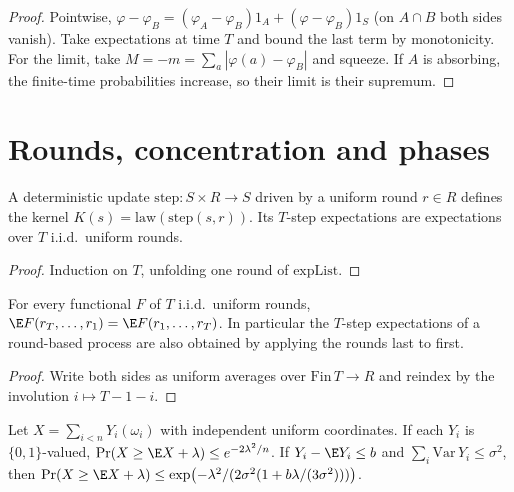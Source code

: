 \begin{proof}\leanok
Pointwise, $\varphi-\varphi_B=(\varphi_A-\varphi_B)1_A+(\varphi-\varphi_B)1_S$ (on
$A\cap B$ both sides vanish). Take expectations at time $T$ and bound the last term by
monotonicity. For the limit, take $M=-m=\sum_a|\varphi(a)-\varphi_B|$ and squeeze. If $A$
is absorbing, the finite-time probabilities increase, so their limit is their supremum.
\end{proof}

\section{Rounds, concentration and phases}
\begin{definition}\label{def:ofstep}
\leanok{}
A deterministic update $\mathrm{step}\colon S\times R\to S$ driven by a uniform
round $r\in R$ defines the kernel $K(s)=\mathrm{law}(\mathrm{step}(s,r))$. Its
$T$-step expectations are expectations over $T$ i.i.d.\ uniform rounds.
\end{definition}
\begin{proof}\leanok
Induction on $T$, unfolding one round of $\mathrm{expList}$.
\end{proof}
\begin{theorem}\label{thm:reverse}
\leanok{}
For every functional $F$ of $T$ i.i.d.\ uniform rounds,
$\E F(r_T,\dots,r_1)=\E F(r_1,\dots,r_T)$. In particular the $T$-step expectations of a
round-based process are also obtained by applying the rounds last to first.
\end{theorem}
\begin{proof}\leanok
Write both sides as uniform averages over $\mathrm{Fin}\,T\to R$ and reindex by the
involution $i\mapsto T-1-i$.
\end{proof}
\begin{theorem}\label{thm:concentration}
\leanok{}
Let $X=\sum_{i<n}Y_i(\omega_i)$ with independent uniform coordinates. If each
$Y_i$ is $\{0,1\}$-valued, $\Pr(X\ge\E X+\lambda)\le e^{-2\lambda^2/n}$. If
$Y_i-\E Y_i\le b$ and $\sum_i\mathrm{Var}\,Y_i\le\sigma^2$, then
$\Pr(X\ge\E X+\lambda)\le\exp\bigl(-\lambda^2/(2\sigma^2(1+b\lambda/(3\sigma^2)))\bigr)$.
\end{theorem}
